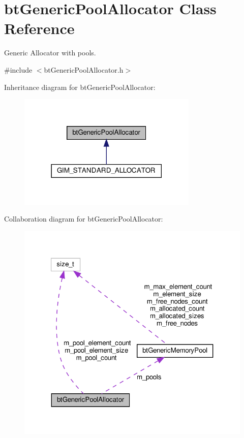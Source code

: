 \hypertarget{classbtGenericPoolAllocator}{}\section{bt\+Generic\+Pool\+Allocator Class Reference}
\label{classbtGenericPoolAllocator}


Generic Allocator with pools.  




{\ttfamily \#include $<$bt\+Generic\+Pool\+Allocator.\+h$>$}



Inheritance diagram for bt\+Generic\+Pool\+Allocator\+:
\nopagebreak
\begin{figure}[H]
\begin{center}
\leavevmode
\includegraphics[width=242pt]{classbtGenericPoolAllocator__inherit__graph}
\end{center}
\end{figure}


Collaboration diagram for bt\+Generic\+Pool\+Allocator\+:
\nopagebreak
\begin{figure}[H]
\begin{center}
\leavevmode
\includegraphics[width=321pt]{classbtGenericPoolAllocator__coll__graph}
\end{center}
\end{figure}
